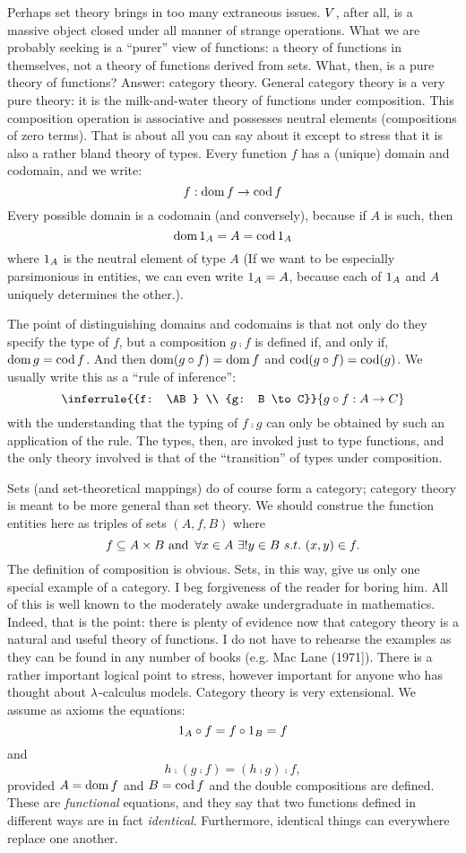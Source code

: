 Perhaps set theory brings in too many extraneous issues. $V$, after all, is a massive object closed under all manner of strange operations. What we are probably seeking is a ``purer'' view of functions: a theory of functions in themselves, not a theory of functions derived from sets. What, then, is a pure theory of functions? Answer: category theory. General category theory is a very pure theory: it is the milk-and-water theory of functions under composition. This composition operation is associative and possesses neutral ele­ments (compositions of zero terms). That is about all you can say about it except to stress that it is also a rather bland theory of types. Every function $f$ has a (unique) domain and codomain, and we write:
$$f: \mathop{\rm dom} f \rightarrow \mathop{\rm cod} f$$
%
Every possible domain is a codomain (and conversely), because if $A$ is such, then
$$\mathop{\rm dom} {\textrm 1}_A = A = \mathop{\rm cod} {\textrm 1}_A$$
%
where ${\textrm 1}_A$ is the neutral element of type $A$ (If we want to be especially parsimonious in entities, we can even write ${\textrm 1}_A = A$, because each of ${\textrm 1}_A$ and $A$ uniquely deter­mines the other.).

The point of distinguishing domains and codomains is that not only do they specify the type of $f$, but a composition $g \comp f$ is
defined if, and only if, $\mathop{\rm dom} g = \mathop{\rm cod} f$. And then $\mathop{\rm dom}(g \circ f) = \mathop{\rm dom} f$ and $\mathop{\rm cod} (g \circ f) = \mathop{\rm cod} (g)$. We usually write this as a ``rule of inference'':
$$
\inferrule
  {{f: \AB} \\ {g: B \to C}}
  {g \comp f: A \to C}
$$
with the understanding that the typing of $f \comp  g$ can only be ob­tained by such an application of the rule. The types, then, are invoked just to type functions, and the only theory involv­ed is that of the ``transition'' of types under composition.

Sets (and set-theoretical mappings) do of course form a cat­egory; category theory is meant to be more general than set theory. We should construe the function entities here as tri­ples of sets $(A,f,B)$ where
$$
f \subseteq A \times B {\textrm{ and }}\, \forall x \in A \,\, \exists! y \in B\,\, s.t. \,\, (x,y) \in f.
$$
%
The definition of composition is obvious. Sets, in this way, give us only one special example of a category.
I beg forgiveness of the reader for boring him. All of this is well known to the moderately awake undergraduate in mathe­matics. Indeed, that is the point: there is plenty of evi­dence now that category theory is a natural and useful theory of functions. I do not have to rehearse the examples as they can be found in any number of books (e.g. Mac Lane (1971]).
There is a rather important logical point to stress, however
important for anyone who has thought about $\lambda$-calculus models. Category theory is very extensional. We assume as axioms the equations:
%
$${\textrm 1}_A \circ f = f \circ {\textrm 1}_B =  f$$
%
and
$$h\comp (g \comp f) = (h \comp g) \comp f,$$
%
provided $A= \mathop{\rm dom} f$ and $B = \mathop{\rm cod} f$ and the double compositions are defined. These are {\it functional} equations, and they say that two functions defined in different ways are in fact {\it identical}.
Furthermore, identical things can everywhere replace one another.

